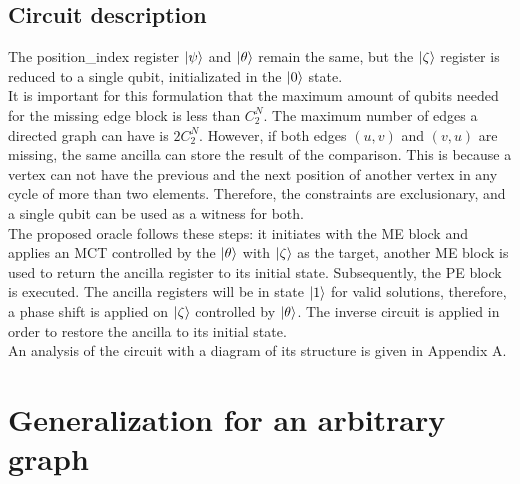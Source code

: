 \documentclass[10pt,a4paper]{article}
\begin{document}
\subsection{Circuit description}
The position\_index register $\ket{\psi}$ and $\ket{\theta}$ remain the same, but the $\ket{\zeta}$ register is reduced to a single qubit, initializated in the $\ket{0}$ state.\\
It is important for this formulation that the maximum amount of qubits needed for the missing edge block is less than $C^N_2$. The maximum number of edges a directed graph can have is $2C^N_2$. However, if both edges $(u, v)$ and $(v, u)$ are missing, the same ancilla can store the result of the comparison. This is because a vertex can not have the previous and the next position of another vertex in any cycle of more than two elements. Therefore, the constraints are exclusionary, and a single qubit can be used as a witness for both.\\
The proposed oracle follows these steps: it initiates with the ME block and applies an MCT controlled by the $\ket{\theta}$ with $\ket{\zeta}$ as the target, another ME block is used to return the ancilla register to its initial state. Subsequently, the PE block is executed. The ancilla registers will be in state $\ket{1}$ for valid solutions, therefore, a phase shift is applied on $\ket{\zeta}$ controlled by $\ket{\theta}$. The inverse circuit is applied in order to restore the ancilla to its initial state.\\
An analysis of the circuit with a diagram of its structure is given in Appendix A.

\section{Generalization for an arbitrary graph}
\end{document}
